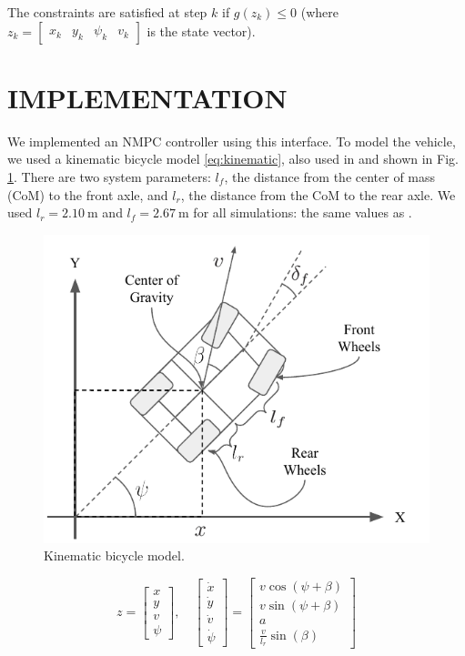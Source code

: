 \documentclass[letterpaper, 10 pt, conference]{ieeeconf}  %
\begin{document}
The constraints are satisfied at step $k$ if $g(z_k) \leq 0$ (where $z_k = \begin{bmatrix}
x_k& y_k& \psi_k& v_k
\end{bmatrix}$ is the state vector).



 \section{IMPLEMENTATION}
 
We implemented an NMPC controller using this interface. To model the vehicle, we used a kinematic bicycle model \eqref{eq:kinematic}, also used in \cite{farag} and shown in Fig. \ref{fig:kinematic}. There are two system parameters: $l_f$, the distance from the center of mass (CoM) to the front axle, and $l_r$, the distance from the CoM to the rear axle. We used $l_r = 2.10\ \text{m}$ and $l_f = 2.67\ \text{m}$ for all simulations: the same values as \cite{farag}.
 
 \begin{figure}[htbp]
 	\centering
 	\includegraphics[width=0.8\linewidth]{figures/kinematic_diagram.pdf}
 	\caption{Kinematic bicycle model.}
 	\label{fig:kinematic}
 \end{figure}
 

 \begin{equation}
 z = \begin{bmatrix}
 x\\y\\v\\\psi
 \end{bmatrix},\quad \begin{bmatrix}
 \dot x\\\dot y\\\dot v\\\dot\psi
 \end{bmatrix} = \begin{bmatrix}
 v\cos(\psi + \beta)\\
 v\sin(\psi + \beta)\\
 a\\
 \frac{v}{l_r}\sin(\beta)
 \end{bmatrix}
 \label{eq:kinematic}
 \end{equation}
 
\end{document}
